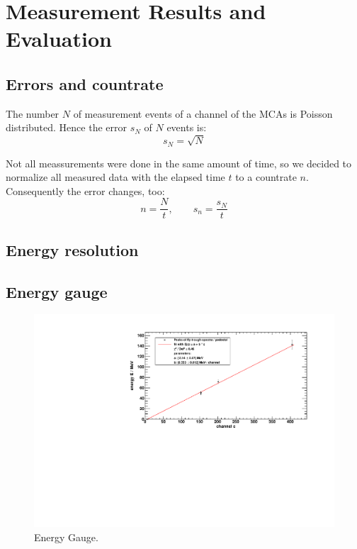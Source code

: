 \section{Measurement Results and Evaluation}

\subsection{Errors and countrate}
The number $N$ of measurement events of a channel of the MCAs is Poisson distributed. Hence the error $s_N$  of $N$ events is:
\begin{equation}
  s_N = \sqrt{N}
\end{equation}

Not all meassurements were done in the same amount of time, so we decided to normalize all measured data with the elapsed time $t$ to a 
countrate $n$. Consequently the error changes, too:
\begin{equation}
    n = \frac{N}{t}, \qquad s_n = \frac{s_N}{t}
\end{equation}

\subsection{Energy resolution}

\subsection{Energy gauge}
\begin{figure}[H]
\begin{center}
  \includegraphics[width=\textwidth]{../img/energyGauge.pdf}
  \caption{Energy Gauge.}
  \label{img:energygauge}
\end{center}
\end{figure}

